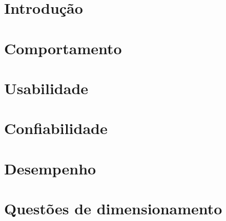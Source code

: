 \section{Introdução} %
\label{sec:introdu_o}
 

\section{Comportamento} %
\label{sec:comportamento}
 

\section{Usabilidade} %
\label{sec:usabilidade}
 

\section{Confiabilidade} %
\label{sec:confiabilidade}
 

\section{Desempenho} %
\label{sec:desempenho}
 

\section{Questões de dimensionamento} %
\label{sec:questoes_de_dimensionamento}
 
